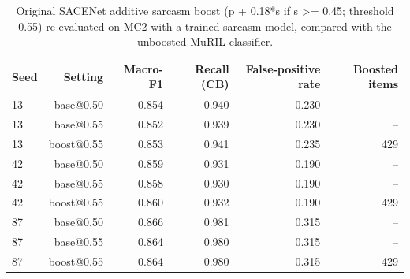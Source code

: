 \begin{table}[t]
\centering
\small
\caption{Original SACENet additive sarcasm boost (p + 0.18*s if s >= 0.45; threshold 0.55) re-evaluated on MC2 with a trained sarcasm model, compared with the unboosted MuRIL classifier.}
\label{tab:tab09_legacy_boost}
\begin{tabular}{lrrrrr}
\toprule
Seed & Setting & Macro-F1 & Recall (CB) & False-positive rate & Boosted items \\
\midrule
13 & base@0.50 & 0.854 & 0.940 & 0.230 & -- \\
13 & base@0.55 & 0.852 & 0.939 & 0.230 & -- \\
13 & boost@0.55 & 0.853 & 0.941 & 0.235 & 429 \\
42 & base@0.50 & 0.859 & 0.931 & 0.190 & -- \\
42 & base@0.55 & 0.858 & 0.930 & 0.190 & -- \\
42 & boost@0.55 & 0.860 & 0.932 & 0.190 & 429 \\
87 & base@0.50 & 0.866 & 0.981 & 0.315 & -- \\
87 & base@0.55 & 0.864 & 0.980 & 0.315 & -- \\
87 & boost@0.55 & 0.864 & 0.980 & 0.315 & 429 \\
\bottomrule
\end{tabular}
\end{table}
